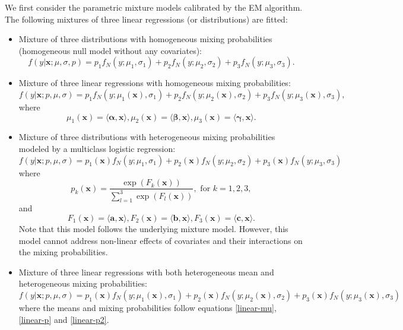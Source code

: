 \documentclass[11pt]{article}
\numberwithin{equation}{section}
\def\bx{\boldsymbol{x}}
\begin{document}
We first consider the parametric mixture models calibrated by the EM algorithm. The following mixtures of three linear regressions (or distributions) are fitted:
\begin{itemize}
	\item 	Mixture of three distributions with homogeneous mixing probabilities (homogeneous null model without any covariates):
	\begin{equation}\label{gaussian-0}
		f(y|\bx;\mu,\sigma,p)=p_1f_N(y;\mu_1,\sigma_1)+p_2f_N(y;\mu_2,\sigma_2)+p_3f_N(y;\mu_3,\sigma_3).
	\end{equation}

	\item 	Mixture of three linear regressions with homogeneous mixing probabilities:
\begin{equation}\label{gaussian-glm-mu}
	f(y|\bx;p,\mu,\sigma)=p_1f_N(y;\mu_1(\bx),\sigma_1)+p_2f_N(y;\mu_2(\bx),\sigma_2)+p_3f_N(y;\mu_3(\bx),\sigma_3),
\end{equation}
where
\begin{equation}\label{linear-mu}
	\mu_1(\bx)=\langle\boldsymbol{\alpha},\bx\rangle, \mu_2(\bx)=\langle\boldsymbol{\beta},\bx\rangle,\mu_3(\bx)=\langle\boldsymbol{\gamma},\bx\rangle.
\end{equation}

\item 	Mixture of three distributions with heterogeneous mixing probabilities modeled by a multiclass logistic regression:
\begin{equation}\label{gaussian-glm-p}
	f(y|\bx;p,\mu,\sigma)=p_1(\bx)f_N(y;\mu_1,\sigma_1)+p_2(\bx)f_N(y;\mu_2,\sigma_2)+p_3(\bx)f_N(y;\mu_3,\sigma_3)
\end{equation}
where
\begin{equation}\label{linear-p}
	p_k(\bx)=\frac{\exp\left(F_k(\bx)\right)}{\sum_{l=1}^{3}\exp\left(F_l(\bx)\right)}, \text{ for } k=1,2,3,
\end{equation}
and 
\begin{equation}\label{linear-p2}
	F_1(\bx)=\langle \boldsymbol{a},\bx\rangle, F_2(\bx)=\langle \boldsymbol{b},\bx\rangle,F_3(\bx)=\langle \boldsymbol{c},\bx\rangle.
\end{equation}
Note that this model follows the underlying mixture model. 
However, this model cannot address non-linear effects of covariates and their interactions on the mixing probabilities.

	\item 	Mixture of three linear regressions with both heterogeneous mean and heterogeneous mixing probabilities:
	\begin{equation}\label{gaussian-glm-b}
		f(y|\bx;p,\mu,\sigma)=p_1(\bx)f_N(y;\mu_1(\bx),\sigma_1)+p_2(\bx)f_N(y;\mu_2(\bx),\sigma_2)+p_3(\bx)f_N(y;\mu_3(\bx),\sigma_3)
	\end{equation}
where the means and mixing probabilities follow equations \eqref{linear-mu}, \eqref{linear-p} and \eqref{linear-p2}.
\end{itemize}
\end{document}
